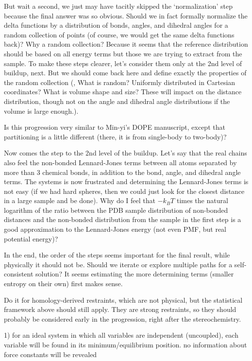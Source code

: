 \begin{itemize}
But wait a second, we just may have tacitly skipped the `normalization' step because the 
final answer was so obvious. Should we in fact formally normalize the delta functions by a distribution
of bonds, angles, and dihedral angles for a random collection of points (of course, we would
get the same delta functions back)? Why a random collection? Because it seems that the
reference distribution should be based on all energy terms but those we are trying to 
extract from the sample. To make these steps clearer, let's consider them only at the 
2nd level of buildup, next. But we should come back here and define exactly the
properties of the random collection (\eg, What is random? Uniformly distributed in 
Cartesian coordinates? What is volume shape and size? These will impact on the 
distance distribution, though not on the angle and dihedral angle distributions if 
the volume is large enough.).

Is this progression very similar to Min-yi's DOPE manuscript, except that partitioning is 
a little different (there, it is from single-body to two-body)? 

Now comes the step to the 2nd level of the buildup. Let's say that the real chains also 
feel the non-bonded Lennard-Jones terms between all atoms separated by more than 3 chemical 
bonds, in addition to the bond, angle, and dihedral angle terms. The systems is now frustrated 
and determining the Lennard-Jones terms is not easy (if we had hard spheres, then we could
just look for the closest distance in a large sample and be done). Why do I feel that
$-k_B T$ times the natural logarithm of the ratio between the PDB sample distribution of 
non-bonded distances and the non-bonded distribution from the sample in the first step is 
a good approximation to the Lennard-Jones energy (not even PMF, but real potential energy)?

In the end, the order of the steps seems important for the final result, while physically it 
should not be. Should we iterate or explore multiple paths for a self-consistent solution? 
It seems estimating the more determining terms (smaller entropy on their own) first makes sense.

Do it for homology-derived restraints, which are not physical, but the statistical framework
above should still apply. They are strong restraints, so they should probably be considered
early in the progression, right after the stereochemistry.

1) for an ideal system in which all variables are independent
(uncoupled), each variable will be found in its minimum/equilibrium
position. no information about force constants will be revealed


\end{itemize}
